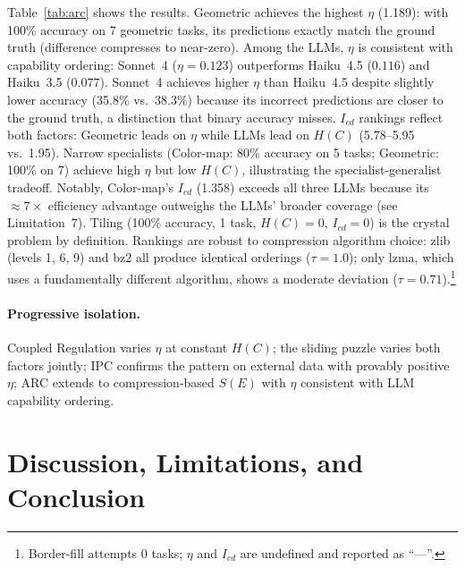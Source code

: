 \documentclass[runningheads,a4paper]{llncs}
\begin{document}
Table~\ref{tab:arc} shows the results. Geometric achieves the highest $\eta$ (1.189): with 100\% accuracy on 7 geometric tasks, its predictions exactly match the ground truth (difference compresses to near-zero). Among the LLMs, $\eta$ is consistent with capability ordering: Sonnet~4 ($\eta = 0.123$) outperforms Haiku~4.5 ($0.116$) and Haiku~3.5 ($0.077$). Sonnet~4 achieves higher $\eta$ than Haiku~4.5 despite slightly lower accuracy (35.8\% vs.\ 38.3\%) because its incorrect predictions are closer to the ground truth, a distinction that binary accuracy misses. $I_{cd}$ rankings reflect both factors: Geometric leads on $\eta$ while LLMs lead on $H(C)$ (5.78--5.95 vs.\ 1.95). Narrow specialists (Color-map: 80\% accuracy on 5 tasks; Geometric: 100\% on 7) achieve high $\eta$ but low $H(C)$, illustrating the specialist-generalist tradeoff. Notably, Color-map's $I_{cd}$ (1.358) exceeds all three LLMs because its ${\approx}7\times$ efficiency advantage outweighs the LLMs' broader coverage (see Limitation~7). Tiling (100\% accuracy, 1 task, $H(C) = 0$, $I_{cd} = 0$) is the crystal problem by definition. Rankings are robust to compression algorithm choice: zlib (levels 1, 6, 9) and bz2 all produce identical orderings ($\tau = 1.0$); only lzma, which uses a fundamentally different algorithm, shows a moderate deviation ($\tau = 0.71$).\footnote{Border-fill attempts 0 tasks; $\eta$ and $I_{cd}$ are undefined and reported as ``---''.}

\paragraph{Progressive isolation.} Coupled Regulation varies $\eta$ at constant $H(C)$; the sliding puzzle varies both factors jointly; IPC confirms the pattern on external data with provably positive $\eta$; ARC extends to compression-based $S(E)$ with $\eta$ consistent with LLM capability ordering.

\section{Discussion, Limitations, and Conclusion}
\label{sec:discussion}
\end{document}
